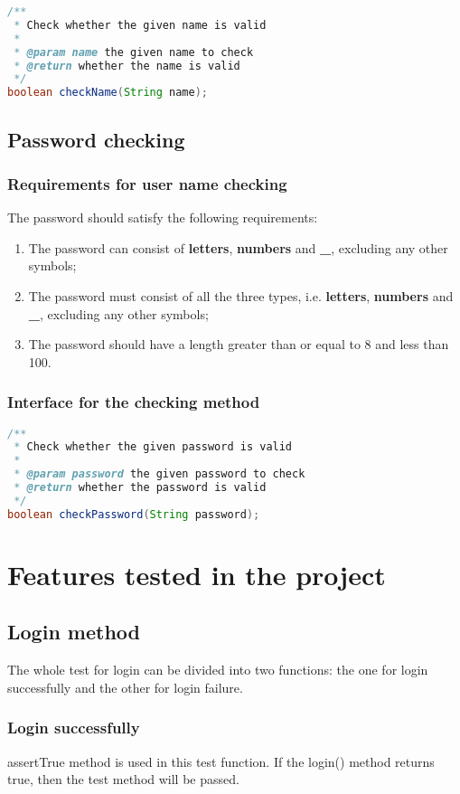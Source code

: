 \documentclass[a4paper]{report}
\begin{document}
\begin{lstlisting}[language=java]
/**
 * Check whether the given name is valid
 *
 * @param name the given name to check
 * @return whether the name is valid
 */
boolean checkName(String name);
\end{lstlisting}
\section{Password checking}
\subsection{Requirements for user name checking}
The password should satisfy the following requirements:
\begin{enumerate}
\item The password can consist of \textbf{letters}, \textbf{numbers} and \textbf{\_}, excluding any other symbols;
\item The password must consist of all the three types, i.e. \textbf{letters}, \textbf{numbers} and \textbf{\_}, excluding any other symbols;
\item The password should have a length greater than or equal to 8 and less than 100.
\end{enumerate}
\subsection{Interface for the checking method}
\begin{lstlisting}[language=java]
/**
 * Check whether the given password is valid
 *
 * @param password the given password to check
 * @return whether the password is valid
 */
boolean checkPassword(String password);
\end{lstlisting}
\chapter{Features tested in the project}
\section{Login method}
\par The whole test for login can be divided into two functions: the one for login successfully and the other for login failure.
\subsection{Login successfully}
\par assertTrue method is used in this test function. If the login() method returns true, then the test method will be passed.
\end{document}
